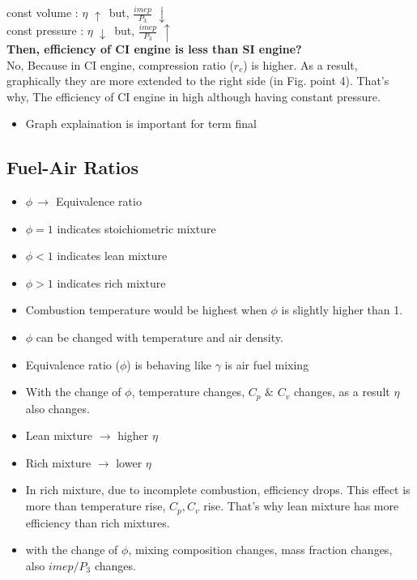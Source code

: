\documentclass{article}
\begin{document}
	\begin{multicols}{2}
		const volume : $\eta \,\, \uparrow \,$ but, $\frac{imep}{P_3} \,\, \downarrow $\\
		const pressure : $\eta \,\, \downarrow \,$ but, $\frac{imep}{P_3} \,\, \uparrow $\\

		\textbf{Then, efficiency of CI engine is less than SI engine?}\\
		No, Because in CI engine, compression ratio ($r_c$) is higher. As a result, graphically they are more extended to the right side (in Fig. point 4). That's why, The efficiency of CI engine in high although having constant pressure. 

		\begin{itemize}
			\item Graph explaination is important for term final 
		\end{itemize}

		\subsection*{Fuel-Air Ratios}
		\begin{itemize}
			\item $\phi\, \rightarrow$ Equivalence ratio  
			\item $\phi=1$ indicates stoichiometric mixture 
			\item $\phi < 1$ indicates lean mixture 
			\item $\phi > 1$ indicates rich mixture 
			\item Combustion temperature would be highest when $\phi$ is slightly higher than 1. 
			\item $\phi$ can be changed with temperature and air density. 
			\item Equivalence ratio ($\phi$) is behaving like $\gamma$ is air fuel mixing 
			\item With the change of $\phi$, temperature changes, $C_p\, \, \&\,\, C_v$ changes, as a result $\eta$ also changes.  
		\end{itemize}

		\begin{itemize}
			\item Lean mixture $\rightarrow$ higher $\eta$
			\item Rich mixture $\rightarrow$ lower $\eta$
			\item In rich mixture, due to incomplete combustion, efficiency drops. This effect is more than temperature rise, $C_p, C_v$ rise. That's why lean mixture has more efficiency than rich mixtures.
			\item with the change of $\phi$, mixing composition changes, mass fraction changes, also $imep/P_3$ changes.   
		\end{itemize}
	\end{multicols}
	\begin{center}
	\end{center}
	\pagebreak 
\end{document}
